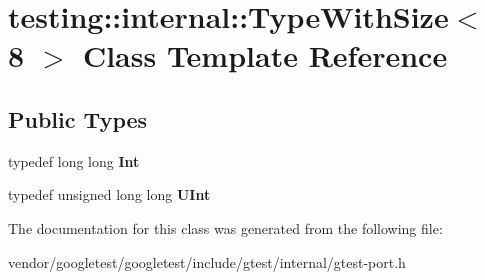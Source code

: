 \hypertarget{classtesting_1_1internal_1_1TypeWithSize_3_018_01_4}{}\section{testing\+:\+:internal\+:\+:Type\+With\+Size$<$ 8 $>$ Class Template Reference}
\label{classtesting_1_1internal_1_1TypeWithSize_3_018_01_4}
\subsection*{Public Types}
\begin{DoxyCompactItemize}
\item 
typedef long long {\bfseries Int}\hypertarget{classtesting_1_1internal_1_1TypeWithSize_3_018_01_4_a36d5697e5f5254b0495f13c97d747e36}{}\label{classtesting_1_1internal_1_1TypeWithSize_3_018_01_4_a36d5697e5f5254b0495f13c97d747e36}

\item 
typedef unsigned long long {\bfseries U\+Int}\hypertarget{classtesting_1_1internal_1_1TypeWithSize_3_018_01_4_a747e21c5aee8faf07ec65cd4c3d1ca62}{}\label{classtesting_1_1internal_1_1TypeWithSize_3_018_01_4_a747e21c5aee8faf07ec65cd4c3d1ca62}

\end{DoxyCompactItemize}


The documentation for this class was generated from the following file\+:\begin{DoxyCompactItemize}
\item 
vendor/googletest/googletest/include/gtest/internal/gtest-\/port.\+h\end{DoxyCompactItemize}
